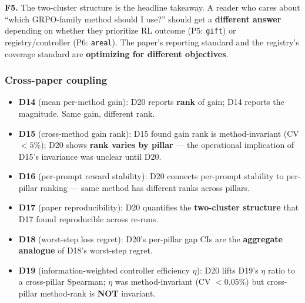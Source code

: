 \textbf{F5.}
The two-cluster structure is the headline takeaway. A reader who cares
about ``which GRPO-family method should I use?'' should get a
\textbf{different answer} depending on whether they prioritize RL outcome
(P5: \texttt{gift}) or registry/controller (P6: \texttt{areal}).
The paper's reporting standard and the registry's coverage standard are
\textbf{optimizing for different objectives}.

\subsubsection{Cross-paper coupling}\label{sec:synth-iter192-d20-coupling}

\begin{itemize}
\item \textbf{D14} (mean per-method gain): D20 reports \textbf{rank} of
  gain; D14 reports the magnitude. Same gain, different rank.
\item \textbf{D15} (cross-method gain rank): D15 found gain rank is
  method-invariant (CV $< 5\%$); D20 shows \textbf{rank varies by
  pillar} --- the operational implication of D15's invariance was
  unclear until D20.
\item \textbf{D16} (per-prompt reward stability): D20 connects per-prompt
  stability to per-pillar ranking --- same method has different ranks
  across pillars.
\item \textbf{D17} (paper reproducibility): D20 quantifies the
  \textbf{two-cluster structure} that D17 found reproducible across re-runs.
\item \textbf{D18} (worst-step loss regret): D20's per-pillar gap CIs are
  the \textbf{aggregate analogue} of D18's worst-step regret.
\item \textbf{D19} (information-weighted controller efficiency $\eta$):
  D20 lifts D19's $\eta$ ratio to a cross-pillar Spearman; $\eta$ was
  method-invariant (CV $< 0.05\%$) but cross-pillar method-rank is
  \textbf{NOT} invariant.
\end{itemize}

